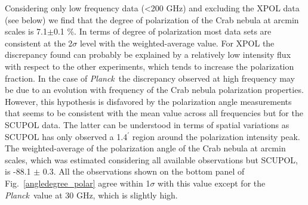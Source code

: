 \documentclass[twocolumn,traditabstract]{aa}
\def\NIKA{\textit{NIKA}}
\def\Planck{\textit{Planck}}
\def\WMAP{\textit{WMAP}}
\begin{document}
Considering only low frequency data (\textless 200 GHz) and excluding the XPOL data (see below) we find that the degree of polarization of the Crab nebula at arcmin scales is 7.1$\pm$0.1 \%.
In terms of degree of polarization most data sets are consistent at the 2$\sigma$ level with the weighted-average value. For XPOL the discrepancy found can probably be explained by a relatively low intensity flux with respect to the other experiments, which tends to increase the polarization fraction. In the case of \Planck\ the discrepancy observed at high frequency may be due to an evolution with frequency of the Crab nebula polarization properties.
However, this hypothesis is disfavored by the polarization
angle measurements that seems to be consistent with the mean value across all frequencies but for the SCUPOL data. The latter can be understood in terms of spatial variations as SCUPOL has only observed a 1.4$^\prime$ region around the polarization intensity peak. 
The weighted-average of the polarization angle of the Crab nebula at arcmin scales, which was estimated considering all available observations but SCUPOL, is -88.1 $\pm$ 0.3.
All the observations shown on the bottom panel of Fig.~\ref{angledegree_polar} agree within 1$\sigma$ with this value except for the \Planck\ value at 30 GHz, which is slightly high. 
\end{document}
